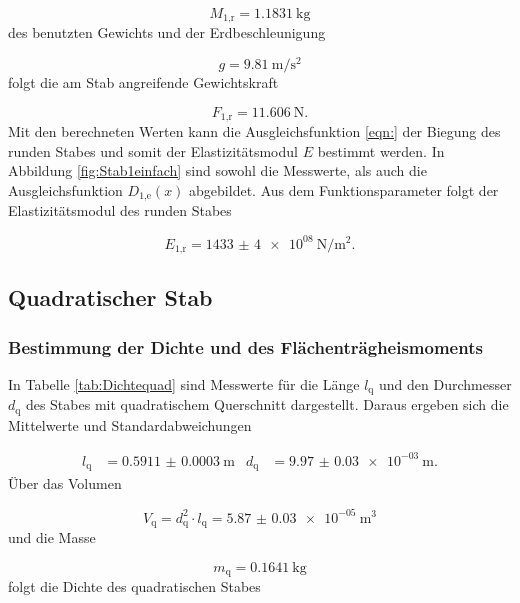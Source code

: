 \begin{equation}
  M_\text{1,r} = \SI{1.1831}{\kilo\gram}
\end{equation}
des benutzten Gewichts und der Erdbeschleunigung \cite{gWert}

\begin{equation}
  g = \SI{9.81}{\meter\per\second\squared}
  \label{eqn:Erdbeschl}
\end{equation}
folgt die am Stab angreifende Gewichtskraft

\begin{equation}
  F_\text{1,r} = \SI{11.606}{\newton}.
\end{equation}
Mit den berechneten Werten kann die Ausgleichsfunktion \eqref{eqn:} der Biegung
des runden Stabes und somit der Elastizitätsmodul $E$ bestimmt werden.
In Abbildung \ref{fig:Stab1einfach} sind sowohl die Messwerte, als auch die
Ausgleichsfunktion $D_\text{1,e}(x)$ abgebildet.
Aus dem Funktionsparameter folgt der Elastizitätsmodul des runden Stabes

\begin{equation}
  E_\text{1,r} = \SI{1433(4)e08}{\newton\per\meter\squared}.
\end{equation}

\subsection{Quadratischer Stab}

\subsubsection{Bestimmung der Dichte und des Flächenträgheismoments}

In Tabelle \ref{tab:Dichtequad} sind Messwerte für die Länge $l_\text{q}$ und
den Durchmesser $d_\text{q}$ des Stabes mit
quadratischem Querschnitt dargestellt.
Daraus ergeben sich die Mittelwerte und Standardabweichungen

\begin{align}
  l_\text{q} & = \SI{0.5911(3)}{\meter} & d_\text{q} & = \SI{9.97(3)e-03}{\meter}.
\end{align}
Über das Volumen

\begin{equation}
  V_\text{q} = d_\text{q}^2 \cdot l_\text{q} = \SI{5.87(3)e-05}{\cubic\meter}
\end{equation}
und die Masse

\begin{equation}
  m_\text{q} = \SI{0.1641}{\kilo\gram}
\end{equation}
folgt die Dichte des quadratischen Stabes

